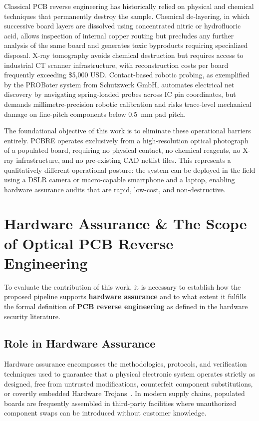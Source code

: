 \documentclass[12pt,a4paper]{report}
\begin{document}
Classical PCB reverse engineering has historically relied on physical and chemical techniques that permanently destroy the sample. Chemical de-layering, in which successive board layers are dissolved using concentrated nitric or hydrofluoric acid, allows inspection of internal copper routing but precludes any further analysis of the same board and generates toxic byproducts requiring specialized disposal. X-ray tomography avoids chemical destruction but requires access to industrial CT scanner infrastructure, with reconstruction costs per board frequently exceeding \$5,000 USD. Contact-based robotic probing, as exemplified by the PROBoter system from Schutzwerk GmbH, automates electrical net discovery by navigating spring-loaded probes across IC pin coordinates, but demands millimetre-precision robotic calibration and risks trace-level mechanical damage on fine-pitch components below 0.5~mm pad pitch.

The foundational objective of this work is to eliminate these operational barriers entirely. PCBRE operates exclusively from a high-resolution optical photograph of a populated board, requiring no physical contact, no chemical reagents, no X-ray infrastructure, and no pre-existing CAD netlist files. This represents a qualitatively different operational posture: the system can be deployed in the field using a DSLR camera or macro-capable smartphone and a laptop, enabling hardware assurance audits that are rapid, low-cost, and non-destructive.

\section{Hardware Assurance \& The Scope of Optical PCB Reverse Engineering}
\label{sec:hw_assurance_scope}

To evaluate the contribution of this work, it is necessary to establish how the proposed pipeline supports \textbf{hardware assurance} and to what extent it fulfills the formal definition of \textbf{PCB reverse engineering} as defined in the hardware security literature.

\subsection{Role in Hardware Assurance}
Hardware assurance encompasses the methodologies, protocols, and verification techniques used to guarantee that a physical electronic system operates strictly as designed, free from untrusted modifications, counterfeit component substitutions, or covertly embedded Hardware Trojans~\cite{lu2020ficspcb}. In modern supply chains, populated boards are frequently assembled in third-party facilities where unauthorized component swaps can be introduced without customer knowledge. 
\end{document}
